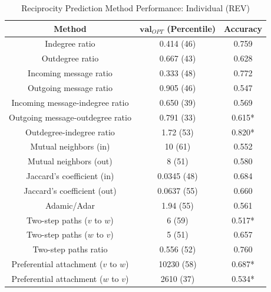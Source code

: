 \documentclass[conference]{IEEEtran}
\begin{document}
\begin{table}[!t]
\renewcommand{\arraystretch}{1.3}
\caption{Reciprocity Prediction Method Performance: Individual (REV)}
\label{table_recresults_indiv}
\centering
\begin{tabular}{|c||c|c|}
\hline
\bf{Method} & $\mathbf{val}_{OPT}$ (Percentile) & \bf{Accuracy} \\
\hline
Indegree ratio & 0.414 (46) & 0.759 \\
Outdegree ratio & 0.667 (43) & 0.628 \\
\hline
Incoming message ratio & 0.333 (48) & 0.772 \\
Outgoing message ratio & 0.905 (46) & 0.547 \\
\hline
Incoming message-indegree ratio & 0.650 (39) & 0.569 \\
Outgoing message-outdegree ratio & 0.791 (33) & 0.615* \\
\hline
Outdegree-indegree ratio & 1.72 (53) & 0.820* \\
\hline
Mutual neighbors (in) & 10 (61) & 0.552 \\
Mutual neighbors (out) & 8 (51) & 0.580 \\
\hline
Jaccard's coefficient (in) & 0.0345 (48) & 0.684 \\
Jaccard's coefficient (out) & 0.0637 (55) & 0.660 \\
\hline
Adamic/Adar & 1.94 (55) & 0.561 \\
\hline
Two-step paths ($v$ to $w$) & 6 (59) & 0.517* \\
Two-step paths ($w$ to $v$) & 5 (51) & 0.657 \\
Two-step paths ratio & 0.556 (52) & 0.760 \\
\hline
Preferential attachment ($v$ to $w$) & 10230 (58) & 0.687* \\
Preferential attachment ($w$ to $v$) & 2610 (37) & 0.534* \\
\hline
\end{tabular}
\end{table}
\end{document}
